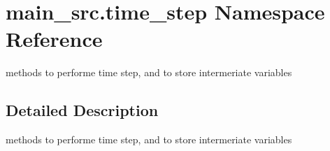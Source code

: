 \hypertarget{namespacemain__src_1_1time__step}{\section{main\-\_\-src.\-time\-\_\-step Namespace Reference}
\label{namespacemain__src_1_1time__step}
}


methods to performe time step, and to store intermeriate variables  




\subsection{Detailed Description}
methods to performe time step, and to store intermeriate variables 